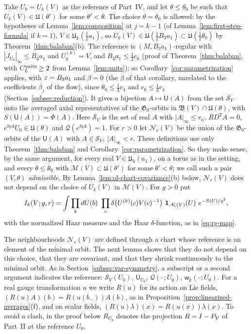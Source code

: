 Take $U_0=U_k(V)$ as the reference of Part~IV, and let $\theta\le\theta_0$ be such that $U_k(V)\in\mathfrak U(\theta')$ for some $\theta'<\theta$. The choice $\theta=\theta_0$ is allowed: by the hypotheses of Lemma~\ref{lem:composition} at $j=k-1$ (of Lemma~\ref{lem:first-step-formula} if $k=1$), $V\in\mathfrak U_k(\frac12a_1)$, so $U_k(V)\in\mathfrak U(\frac12B_3a_1)\subset\mathfrak U(\frac12\theta_0)$ by Theorem~\ref{thm:balaban}(b). The reference is $(M,B_3a_1)$-regular with $|J_{U_0}|_\infty\le B_3a_1$ and $U_0^{(k)}=V$, and $B_3a_1\le\frac12c_6$ (proof of Theorem~\ref{thm:balaban}, with $C^{\rm units}_L\ge2$ from Lemma~\ref{lem:units}); so Corollary~\ref{cor:parametrization} applies, with $\varepsilon=B_3a_1$ and $\beta=0$ (the $\beta$ of that corollary, unrelated to the coefficients $\beta_j$ of the flow), since $\theta_0\le\frac13c_4$ and $c_6\le\frac13c_4$ (Section~\ref{subsec:reduction}). It gives a bijection $A\mapsto\mathsf U(A)$ from the set $\mathcal S_V$ onto the averaged axial representatives of the $\mathfrak G_0$-orbits in $\mathfrak B(V)\cap\mathfrak U(\theta)$, with $S(\mathsf U(A))=\Phi(A)$. Here $\mathcal S_V$ is the set of real $A$ with $|A|_\infty\le r_u$, $RD^TA=0$, $e^{\ii\eta A}U_0\in\mathfrak U(\theta)$ and $\mathcal Q(e^{\ii\eta A})=1$. For $r>0$ let $\mathscr N_r(V)$ be the union of the $\mathfrak G_0$-orbits of the $\mathsf U(A)$ with $A\in\mathcal S_V$, $|A|_\infty<r$. These definitions use only Theorem~\ref{thm:balaban} and Corollary~\ref{cor:parametrization}. So they make sense, by the same argument, for every real $V\in\mathfrak U_k(a_1)$, on a torus as in the setting, and every $\theta\le\theta_0$ with $\mathscr M(V)\subset\mathfrak U(\theta')$ for some $\theta'<\theta$; we call such a pair $(V,\theta)$ \emph{admissible}. By Lemma~\ref{lem:ol-chart-covariance}(b) below, $\mathscr N_r(V)$ does not depend on the choice of $U_k(V)$ in $\mathscr M(V)$. For $g>0$ put
\[
I_k(V;g,r)=\int\prod_bdU(b)\ \prod_c\delta\big(U^{(k)}(c)V(c)^{-1}\big)\ \one_{\mathscr N_r(V)}(U)\ e^{-S(U)/g^2},
\]
with the normalized Haar measure and the Haar $\delta$-function, as in \eqref{eq:rg-map}.

The neighbourhoods $\mathscr N_r(V)$ are defined through a chart whose reference is an element of the minimal orbit. The next lemma shows that they do not depend on this choice, that they are covariant, and that they shrink continuously to the minimal orbit. As in Section~\ref{subsec:var-symmetry}, a subscript or a second argument indicates the reference: $\mathcal S_V(U_0)$, $\mathsf U_{U_0}$, $\mathcal Q(\cdot\,;U_0)$, $\mathsf w_k(\cdot\,;U_0)$. For a real gauge transformation $u$ we write $R(u)$ for its action on Lie fields, $(R(u)A)(b)=R(u(b_-))A(b)$, as in Proposition~\ref{prop:linearized-averages}(f), and on scalar fields, $(R(u)\lambda)(x)=R(u(x))\lambda(x)$. To avoid a clash, in the proof below $R_{U_0}$ denotes the projection $R=I-P_\mathcal V$ of Part~II at the reference $U_0$.

